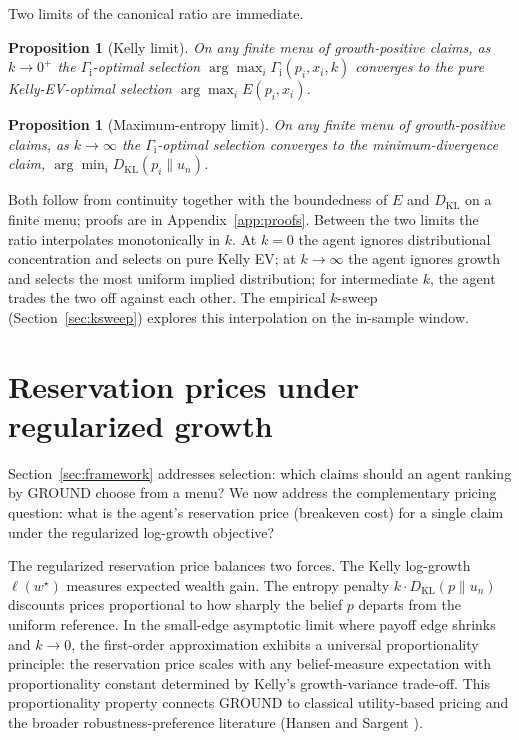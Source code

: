 \documentclass[11pt]{article}
\newtheorem{proposition}[theorem]{Proposition}
\theoremstyle{definition}
\theoremstyle{remark}
\newcommand{\KL}{D_{\mathrm{KL}}}
\newcommand{\GROUND}{\Gamma_{\mathrm{i}}}
\begin{document}
Two limits of the canonical ratio are immediate.

\begin{proposition}[Kelly limit]\label{prop:kelly-limit}
On any finite menu of growth-positive claims, as $k \to 0^+$ the
$\GROUND$-optimal selection $\arg\max_i \GROUND(p_i, x_i, k)$ converges
to the pure Kelly-EV-optimal selection $\arg\max_i E(p_i, x_i)$.
\end{proposition}

\begin{proposition}[Maximum-entropy limit]\label{prop:maxent-limit}
On any finite menu of growth-positive claims, as $k \to \infty$ the
$\GROUND$-optimal selection converges to the minimum-divergence claim,
$\arg\min_i \KL(p_i \| u_n)$.
\end{proposition}

Both follow from continuity together with the boundedness of $E$
and $\KL$ on a finite menu; proofs are in
Appendix~\ref{app:proofs}. Between the two limits the ratio
interpolates monotonically in $k$. At $k = 0$ the agent ignores
distributional concentration and selects on pure Kelly EV; at
$k \to \infty$ the agent ignores growth and selects the most uniform
implied distribution; for intermediate $k$, the agent trades the
two off against each other. The empirical $k$-sweep
(Section~\ref{sec:ksweep}) explores this interpolation on the
in-sample window.


\section{Reservation prices under regularized growth}\label{sec:reservation-theory}

Section~\ref{sec:framework} addresses selection: which claims should an agent ranking by
GROUND choose from a menu? We now address the complementary pricing question: what
is the agent's reservation price (breakeven cost) for a single claim under the
regularized log-growth objective?

The regularized reservation price balances two forces. The Kelly log-growth $\ell(w^\star)$
measures expected wealth gain. The entropy penalty $k \cdot \KL(p \| u_n)$ discounts prices
proportional to how sharply the belief $p$ departs from the uniform reference. In the
small-edge asymptotic limit where payoff edge shrinks and $k \to 0$, the first-order
approximation exhibits a universal proportionality principle: the reservation price scales
with any belief-measure expectation with proportionality constant determined by Kelly's
growth-variance trade-off. This proportionality property connects GROUND to classical
utility-based pricing and the broader robustness-preference literature (Hansen and Sargent \cite{hansen2008robustness}).
\end{document}
